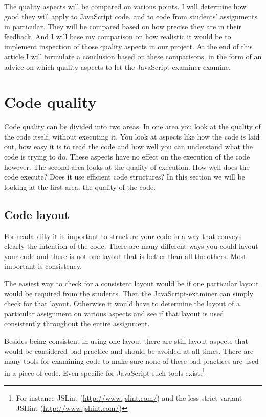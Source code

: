 \documentclass{article}
\begin{document}
The quality aspects will be compared on various points. I will determine how
good they will apply to JavaScript code, and to code from students' assignments
in particular. They will be compared based on how precise they are in their
feedback. And I will base my comparison on how realistic it would be to
implement inspection of those quality aspects in our project. At the end of this article I will formulate a conclusion based on these comparisons, in the form of an advice on which quality aspects to let the JavaScript-examiner examine.

\section{Code quality}

Code quality can be divided into two areas. In one area you look at the quality
of the code itself, without executing it. You look at aspects like how the code
is laid out, how easy it is to read the code and how well you can understand
what the code is trying to do. These aspects have no effect on the execution of
the code however. The second area looks at the quality of execution. How well
does the code execute? Does it use efficient code structures? In this section we will be looking at the first area: the quality of the code.

\subsection{Code layout}

For readability it is important to structure your code in a way that conveys clearly the intention of the code. There are many different ways you could layout your code and there is not one layout that is better than all the others. Most important is consistency.

The easiest way to check for a consistent layout would be if one particular layout would be required from the students. Then the JavaScript-examiner can simply check for that layout. Otherwise it would have to determine the layout of a particular assignment on various aspects and see if that layout is used consistently throughout the entire assignment.

Besides being consistent in using one layout there are still layout aspects
that would be considered bad practice and should be avoided at all times. There
are many tools for examining code to make sure none of these bad practices are
used in a piece of code. Even specific for JavaScript such tools
exist.\footnote{For instance JSLint (\url{http://www.jslint.com/}) and the less
strict variant JSHint (\url{http://www.jshint.com/})}
\end{document}
